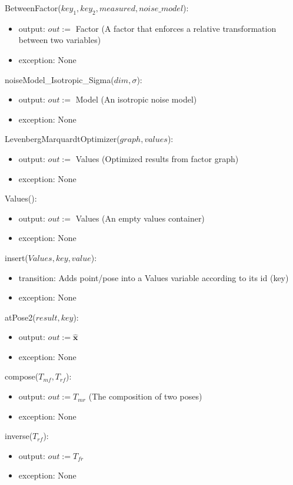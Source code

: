 \documentclass[12pt, titlepage]{article}
\begin{document}
\noindent BetweenFactor($key_1, key_2, measured, noise\_model$):
\begin{itemize}
    \item output: $out:=$ Factor (A factor that enforces a relative transformation between two variables)
    \item exception: None
\end{itemize}

\noindent noiseModel\_Isotropic\_Sigma($dim, \sigma$):
\begin{itemize}
    \item output: $out:=$ Model (An isotropic noise model)
    \item exception: None
\end{itemize}

\noindent LevenbergMarquardtOptimizer($graph, values$):
\begin{itemize}
    \item output: $out:=$ Values (Optimized results from factor graph)
    \item exception: None
\end{itemize}

\noindent Values():
\begin{itemize}
    \item output: $out:=$ Values (An empty values container)
    \item exception: None
\end{itemize}

\noindent insert($Values, key, value$):
\begin{itemize}
    \item transition: Adds point/pose into a Values variable according to its id (key)
    \item exception: None
\end{itemize}

\noindent atPose2($result, key$):
\begin{itemize}
    \item output: $out:= \mathbf{\hat{x}}$ 
    \item exception: None
\end{itemize}

\noindent compose($T_{mf}, T_{rf}$):
\begin{itemize}
    \item output: $out:= T_{mr}$ (The composition of two poses)
    \item exception: None
\end{itemize}

\noindent inverse($T_{rf}$):
\begin{itemize}
    \item output: $out:= T_{fr}$
    \item exception: None
\end{itemize}
\end{document}
